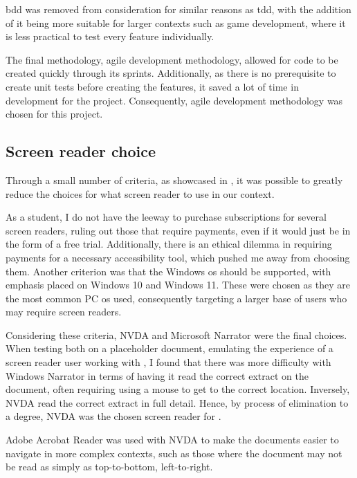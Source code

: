\Acrshort{bdd} was removed from consideration for similar reasons as \acrshort{tdd}, with the addition of it being more suitable for larger contexts such as game development, where it is less practical to test every feature individually.

The final methodology, agile development methodology, allowed for code to be created quickly through its sprints. Additionally, as there is no prerequisite to create unit tests before creating the features, it saved a lot of time in development for the project. Consequently, agile development methodology was chosen for this project.

\subsection{\nmu Screen \nmu reader choice}\label{backg:screen_reader_choice}
Through a small number of criteria, as showcased in , it was possible to greatly reduce the choices for what screen reader to use in our context.



As a student, I do not have the leeway to purchase subscriptions for several screen readers, ruling out those that require payments, even if it would just be in the form of a free trial. Additionally, there is an ethical dilemma in requiring payments for a necessary accessibility tool, which pushed me away from choosing them. Another criterion was that the Windows \acrfull{os} should be supported, with emphasis placed on Windows 10 and Windows 11. These were chosen as they are the most common PC \acrshort{os} used, consequently targeting a larger base of users who may require screen readers.

Considering these criteria, NVDA and Microsoft Narrator were the final choices. When testing both on a placeholder document, emulating the experience of a screen reader user working with \latex , I found that there was more difficulty with Windows Narrator in terms of having it read the correct extract on the document, often requiring using a mouse to get to the correct location. Inversely, NVDA read the correct extract in full detail. Hence, by process of elimination to a degree, NVDA was the chosen screen reader for \lintex.

Adobe Acrobat Reader was used with NVDA to make the documents easier to navigate in more complex contexts, such as those where the document may not be read as simply as top-to-bottom, left-to-right.


